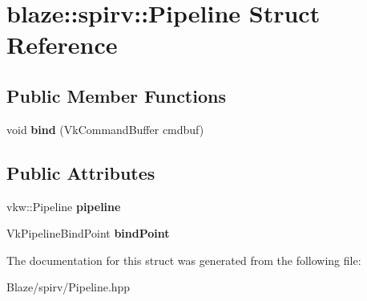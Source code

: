 \hypertarget{structblaze_1_1spirv_1_1Pipeline}{}\section{blaze\+:\+:spirv\+:\+:Pipeline Struct Reference}
\label{structblaze_1_1spirv_1_1Pipeline}
\subsection*{Public Member Functions}
\begin{DoxyCompactItemize}
\item 
\mbox{\label{structblaze_1_1spirv_1_1Pipeline_a29a57d4ce3b934d5f23398eab5609cf7}} 
void {\bfseries bind} (Vk\+Command\+Buffer cmdbuf)
\end{DoxyCompactItemize}
\subsection*{Public Attributes}
\begin{DoxyCompactItemize}
\item 
\mbox{\label{structblaze_1_1spirv_1_1Pipeline_a013ec27941075de8125c23e142ab4931}} 
vkw\+::\+Pipeline {\bfseries pipeline}
\item 
\mbox{\label{structblaze_1_1spirv_1_1Pipeline_a71832ee550924d6b1bb0e10ea8bd817c}} 
Vk\+Pipeline\+Bind\+Point {\bfseries bind\+Point}
\end{DoxyCompactItemize}


The documentation for this struct was generated from the following file\+:\begin{DoxyCompactItemize}
\item 
Blaze/spirv/Pipeline.\+hpp\end{DoxyCompactItemize}
